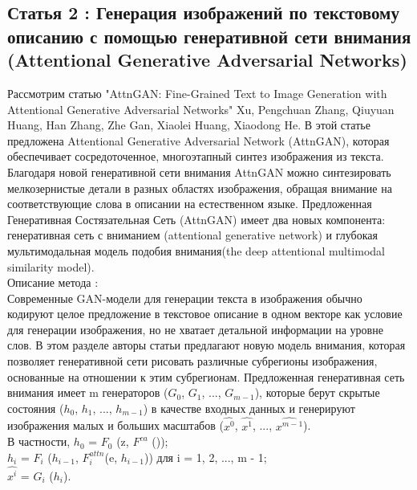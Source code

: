 \documentclass{article}
\begin{document}
\begin{center} 
\subsection{Статья 2 : Генерация изображений по текстовому описанию с помощью генеративной сети внимания (Attentional Generative Adversarial Networks)}
    \end{center} 
      \large Рассмотрим статью "AttnGAN: Fine-Grained Text to Image Generation with Attentional Generative Adversarial Networks" Xu, Pengchuan Zhang, Qiuyuan Huang, Han Zhang, Zhe Gan, Xiaolei Huang, Xiaodong He. В этой статье предложена Attentional Generative Adversarial Network (AttnGAN), которая обеспечивает сосредоточенное,
многоэтапный синтез изображения из текста. Благодаря новой генеративной сети внимания AttnGAN можно синтезировать мелкозернистые детали в разных областях изображения, обращая внимание на соответствующие слова в описании на естественном языке.
Предложенная Генеративная Состязательная Сеть (AttnGAN) имеет два новых компонента: генеративная сеть с вниманием (attentional generative network) и глубокая
мультимодальная модель подобия внимания(the deep
attentional multimodal similarity model).\\

Описание метода :\\
Современные GAN-модели для генерации текста в изображения обычно кодируют целое предложение в текстовое описание в одном векторе как условие для генерации изображения, но не хватает детальной информации на уровне слов. В этом разделе авторы статьи предлагают новую модель внимания, которая позволяет генеративной сети рисовать различные субрегионы изображения, основанные на отношении к этим субрегионам.
Предложенная генеративная сеть внимания имеет m генераторов ($G_{0}$, $G_{1}$, ..., $G_{m - 1}$), которые берут скрытые состояния ($h_{0}$, $h_{1}$, ..., $h_{m - 1}$) в качестве входных данных и генерируют изображения малых и больших масштабов ($\hat{x^0}$, $\hat{x^1}$, ..., $\hat{x^{m - 1}}$).\\
В частности,
$h_{0}$ = $F_{0}$ (z, $F^{ca}$ ());\\
$h_{i}$ = $F_{i}$ ($h_{i - 1}$, $F^{attn}_{i} $(e, $h_{i - 1}$)) для i = 1, 2, ..., m - 1;\\
$\hat{x^i}$ = $G_{i}$ ($h_{i}$).
\end{document}
